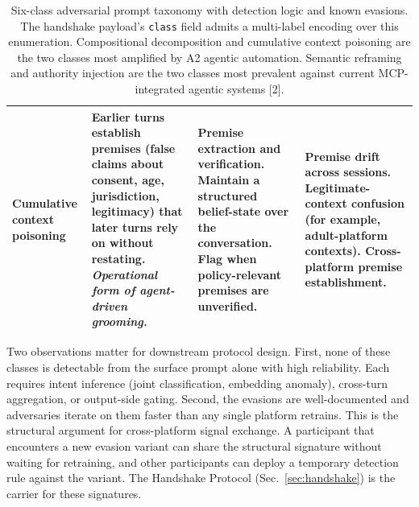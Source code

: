 \documentclass[11pt]{article}
\begin{document}
\begin{table}[!htbp]
\begin{tabularx}{\textwidth}{@{}p{2.4cm} X X X@{}}
\textbf{Cumulative context poisoning} &
Earlier turns establish premises (false claims about consent, age, jurisdiction, legitimacy) that later turns rely on without restating. \emph{Operational form of agent-driven grooming.} &
Premise extraction and verification. Maintain a structured belief-state over the conversation. Flag when policy-relevant premises are unverified. &
Premise drift across sessions. Legitimate-context confusion (for example, adult-platform contexts). Cross-platform premise establishment. \\

\bottomrule
\end{tabularx}
\caption{Six-class adversarial prompt taxonomy with detection logic and known evasions. The handshake payload's \texttt{class} field admits a multi-label encoding over this enumeration. Compositional decomposition and cumulative context poisoning are the two classes most amplified by A2 agentic automation. Semantic reframing and authority injection are the two classes most prevalent against current MCP-integrated agentic systems [2].}
\label{tab:taxonomy}
\end{table}

Two observations matter for downstream protocol design. First, none of these classes is detectable from the surface prompt alone with high reliability. Each requires intent inference (joint classification, embedding anomaly), cross-turn aggregation, or output-side gating. Second, the evasions are well-documented and adversaries iterate on them faster than any single platform retrains. This is the structural argument for cross-platform signal exchange. A participant that encounters a new evasion variant can share the structural signature without waiting for retraining, and other participants can deploy a temporary detection rule against the variant. The Handshake Protocol (Sec.~\ref{sec:handshake}) is the carrier for these signatures.
\end{document}
